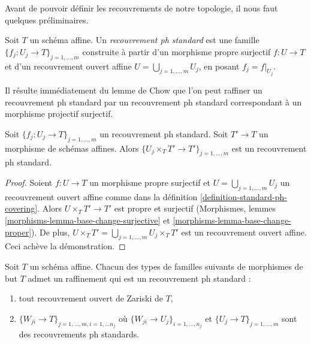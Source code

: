\medskip\noindent
Avant de pouvoir définir les recouvrements de notre topologie, il nous faut
quelques préliminaires.

\begin{definition}
\label{definition-standard-ph-covering}
Soit $T$ un schéma affine. Un {\it recouvrement ph standard} est une famille
$\{f_j : U_j \to T\}_{j = 1, \ldots, m}$ construite à partir d'un
morphisme propre surjectif $f : U \to T$ et d'un recouvrement ouvert affine
$U = \bigcup_{j = 1, \ldots, m} U_j$, en posant $f_j = f|_{U_j}$.
\end{definition}

\noindent
Il résulte immédiatement du lemme de Chow que l'on peut raffiner un
recouvrement ph standard par un recouvrement ph standard correspondant à
un morphisme projectif surjectif.

\begin{lemma}
\label{lemma-base-change-standard-ph}
Soit $\{f_j : U_j \to T\}_{j = 1, \ldots, m}$ un recouvrement ph standard.
Soit $T' \to T$ un morphisme de schémas affines.
Alors $\{U_j \times_T T' \to T'\}_{j = 1, \ldots, m}$ est un
recouvrement ph standard.
\end{lemma}

\begin{proof}
Soient $f : U \to T$ un morphisme propre surjectif et
$U = \bigcup_{j = 1, \ldots, m} U_j$ un recouvrement ouvert affine comme dans la
définition \ref{definition-standard-ph-covering}.
Alors $U \times_T T' \to T'$ est propre et surjectif
(Morphismes, lemmes \ref{morphisms-lemma-base-change-surjective} et
\ref{morphisms-lemma-base-change-proper}).
De plus, $U \times_T T' = \bigcup_{j = 1, \ldots, m} U_j \times_T T'$
est un recouvrement ouvert affine.
Ceci achève la démonstration.
\end{proof}

\begin{lemma}
\label{lemma-refine-by-standard-ph}
Soit $T$ un schéma affine. Chacun des types de familles suivants
de morphismes de but $T$ admet un raffinement qui est un recouvrement ph standard :
\begin{enumerate}
\item tout recouvrement ouvert de Zariski de $T$,
\item $\{W_{ji} \to T\}_{j = 1, \ldots, m, i = 1, \ldots n_j}$
où $\{W_{ji} \to U_j\}_{i = 1, \ldots, n_j}$
et $\{U_j \to T\}_{j = 1, \ldots, m}$ sont des recouvrements ph standards.
\end{enumerate}
\end{lemma}

